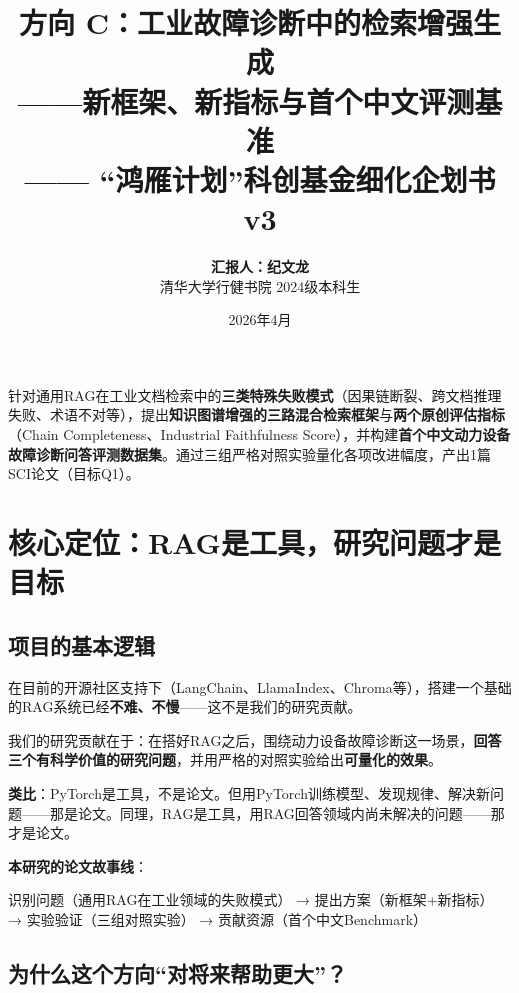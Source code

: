 \documentclass[a4paper, 11pt]{ctexart}
\title{\vspace{-1.5cm}\color{tsinghua}\textbf{方向 C：工业故障诊断中的检索增强生成\\——新框架、新指标与首个中文评测基准}\\\Large{—— ``鸿雁计划''科创基金细化企划书 v3}}
\author{\textbf{汇报人：纪文龙} \\ \small 清华大学行健书院 2024级本科生}
\date{\small 2026年4月}
\begin{document}
\maketitle
\thispagestyle{empty}

\begin{tcolorbox}[colback=tsinghua!5, colframe=tsinghua!50, title=\textbf{一句话概括}, fonttitle=\bfseries]
针对通用RAG在工业文档检索中的\textbf{三类特殊失败模式}（因果链断裂、跨文档推理失败、术语不对等），提出\textbf{知识图谱增强的三路混合检索框架}与\textbf{两个原创评估指标}（Chain Completeness、Industrial Faithfulness Score），并构建\textbf{首个中文动力设备故障诊断问答评测数据集}。通过三组严格对照实验量化各项改进幅度，产出1篇SCI论文（目标Q1）。
\end{tcolorbox}

\section{核心定位：RAG是工具，研究问题才是目标}

\subsection{项目的基本逻辑}

在目前的开源社区支持下（LangChain、LlamaIndex、Chroma等），搭建一个基础的RAG系统已经\textbf{不难、不慢}——这不是我们的研究贡献。

我们的研究贡献在于：在搭好RAG之后，围绕动力设备故障诊断这一场景，\textbf{回答三个有科学价值的研究问题}，并用严格的对照实验给出\textbf{可量化的效果}。

\begin{tcolorbox}[colback=bglight, colframe=tsinghua!30, arc=2mm]
\textbf{类比}：PyTorch是工具，不是论文。但用PyTorch训练模型、发现规律、解决新问题——那是论文。同理，RAG是工具，用RAG回答领域内尚未解决的问题——那才是论文。

\medskip
\textbf{本研究的论文故事线}：\\
\centerline{识别问题（通用RAG在工业领域的失败模式） → 提出方案（新框架+新指标） → 实验验证（三组对照实验） → 贡献资源（首个中文Benchmark）}
\end{tcolorbox}

\subsection{为什么这个方向``对将来帮助更大''？}
\end{document}
